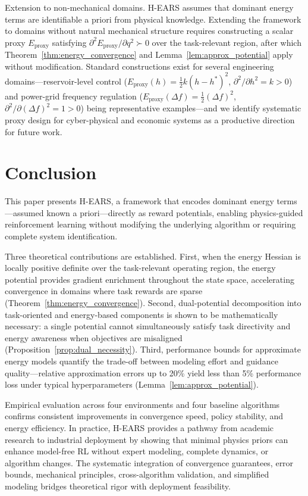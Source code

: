 \documentclass[journal]{IEEEtran}
\begin{document}
	Extension to non-mechanical domains. H-EARS assumes that dominant energy terms are identifiable a priori from physical knowledge. Extending the framework to domains without natural mechanical structure requires constructing a scalar proxy $E_{\text{proxy}}$ satisfying $\partial^2 E_{\text{proxy}}/\partial q^2\succ 0$ over the task-relevant region, after which Theorem~\ref{thm:energy_convergence} and Lemma~\ref{lem:approx_potential} apply without modification. Standard constructions exist for several engineering domains---reservoir-level control ($E_{\text{proxy}}(h)=\tfrac{1}{2}k(h-h^*)^2$, $\partial^2/\partial h^2 = k>0$) and power-grid frequency regulation ($E_{\text{proxy}}(\Delta f)=\tfrac{1}{2}(\Delta f)^2$, $\partial^2/\partial(\Delta f)^2=1>0$) being representative examples---and we identify systematic proxy design for cyber-physical and economic systems as a productive direction for future work.
	
	\section{Conclusion}
	
	This paper presents H-EARS, a framework that encodes dominant energy terms---assumed known a priori---directly as reward potentials, enabling physics-guided reinforcement learning without modifying the underlying algorithm or requiring complete system identification.
	
	Three theoretical contributions are established. First, when the energy Hessian is locally positive definite over the task-relevant operating region, the energy potential provides gradient enrichment throughout the state space, accelerating convergence in domains where task rewards are sparse (Theorem~\ref{thm:energy_convergence}). Second, dual-potential decomposition into task-oriented and energy-based components is shown to be mathematically necessary: a single potential cannot simultaneously satisfy task directivity and energy awareness when objectives are misaligned (Proposition~\ref{prop:dual_necessity}). Third, performance bounds for approximate energy models quantify the trade-off between modeling effort and guidance quality---relative approximation errors up to 20\% yield less than 5\% performance loss under typical hyperparameters (Lemma~\ref{lem:approx_potential}).
	
	Empirical evaluation across four environments and four baseline algorithms confirms consistent improvements in convergence speed, policy stability, and energy efficiency. In practice, H-EARS provides a pathway from academic research to industrial deployment by showing that minimal physics priors can enhance model-free RL without expert modeling, complete dynamics, or algorithm changes. The systematic integration of convergence guarantees, error bounds, mechanical principles, cross-algorithm validation, and simplified modeling bridges theoretical rigor with deployment feasibility.
	
\end{document}
